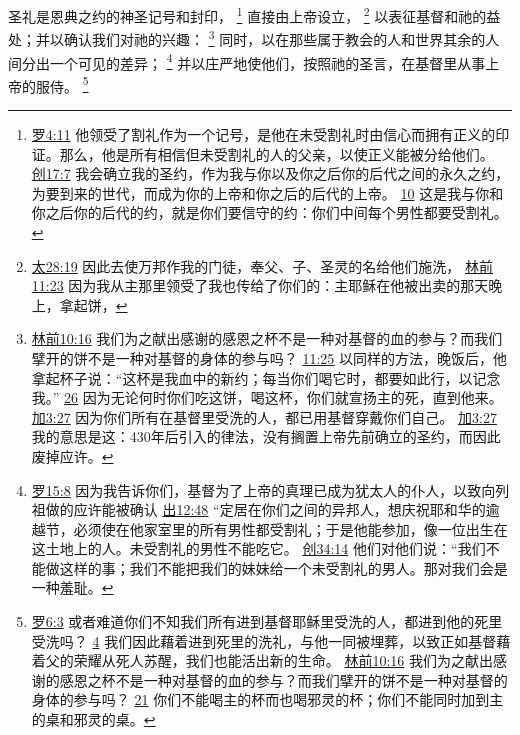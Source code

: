 \documentclass[12pt, a4paper, oneside]{ctexart}
\newcounter{parnum}[section]
\newcommand{\N}{%
   \noindent\refstepcounter{parnum}%
    \makebox[\parindent][l]{\textbf{\arabic{parnum}.}}}
\begin{document}
\N 圣礼是恩典之约的神圣记号和封印，
	\footnote {
		\href{https://biblehub.com/romans/4-11.htm}{罗4:11} 他领受了割礼作为一个记号，是他在未受割礼时由信心而拥有正义的印证。那么，他是所有相信但未受割礼的人的父亲，以使正义能被分给他们。
		\href{https://biblehub.com/genesis/17-7.htm}{创17:7} 我会确立我的圣约，作为我与你以及你之后你的后代之间的永久之约，为要到来的世代，而成为你的上帝和你之后的后代的上帝。
		\href{https://biblehub.com/genesis/17-10.htm}{10} 这是我与你和你之后你的后代的约，就是你们要信守的约：你们中间每个男性都要受割礼。
	}
	直接由上帝设立，
	\footnote {
		\href{https://biblehub.com/matthew/28-19.htm}{太28:19} 因此去使万邦作我的门徒，奉父、子、圣灵的名给他们施洗，
		\href{https://biblehub.com/1_corinthians/11-23.htm}{林前11:23} 因为我从主那里领受了我也传给了你们的：主耶稣在他被出卖的那天晚上，拿起饼，
	}
	以表征基督和祂的益处；并以确认我们对祂的兴趣：
	\footnote {
		\href{https://biblehub.com/1_corinthians/10-16.htm}{林前10:16} 我们为之献出感谢的感恩之杯不是一种对基督的血的参与？而我们擘开的饼不是一种对基督的身体的参与吗？
		\href{https://biblehub.com/1_corinthians/11-25.htm}{11:25} 以同样的方法，晚饭后，他拿起杯子说：“这杯是我血中的新约；每当你们喝它时，都要如此行，以记念我。”
		\href{https://biblehub.com/1_corinthians/11-26.htm}{26} 因为无论何时你们吃这饼，喝这杯，你们就宣扬主的死，直到他来。
		\href{https://biblehub.com/galatians/3-27.htm}{加3:27} 因为你们所有在基督里受洗的人，都已用基督穿戴你们自己。
		\href{https://biblehub.com/galatians/3-17.htm}{加3:27} 我的意思是这：430年后引入的律法，没有搁置上帝先前确立的圣约，而因此废掉应许。
	}
	同时，以在那些属于教会的人和世界其余的人间分出一个可见的差异；
	\footnote {
		\href{https://biblehub.com/romans/15-8.htm}{罗15:8} 因为我告诉你们，基督为了上帝的真理已成为犹太人的仆人，以致向列祖做的应许能被确认
		\href{https://biblehub.com/exodus/12-48.htm}{出12:48} “定居在你们之间的异邦人，想庆祝耶和华的逾越节，必须使在他家室里的所有男性都受割礼；于是他能参加，像一位出生在这土地上的人。未受割礼的男性不能吃它。
		\href{https://biblehub.com/genesis/34-14.htm}{创34:14} 他们对他们说：“我们不能做这样的事；我们不能把我们的妹妹给一个未受割礼的男人。那对我们会是一种羞耻。
	}
	并以庄严地使他们，按照祂的圣言，在基督里从事上帝的服侍。
	\footnote {
		\href{https://biblehub.com/romans/6-3.htm}{罗6:3} 或者难道你们不知我们所有进到基督耶稣里受洗的人，都进到他的死里受洗吗？
		\href{https://biblehub.com/romans/6-4.htm}{4} 我们因此藉着进到死里的洗礼，与他一同被埋葬，以致正如基督藉着父的荣耀从死人苏醒，我们也能活出新的生命。
		\href{https://biblehub.com/1_corinthians/10-16.htm}{林前10:16} 我们为之献出感谢的感恩之杯不是一种对基督的血的参与？而我们擘开的饼不是一种对基督的身体的参与吗？
		\href{https://biblehub.com/1_corinthians/10-21.htm}{21} 你们不能喝主的杯而也喝邪灵的杯；你们不能同时加到主的桌和邪灵的桌。
	}
\end{document}
